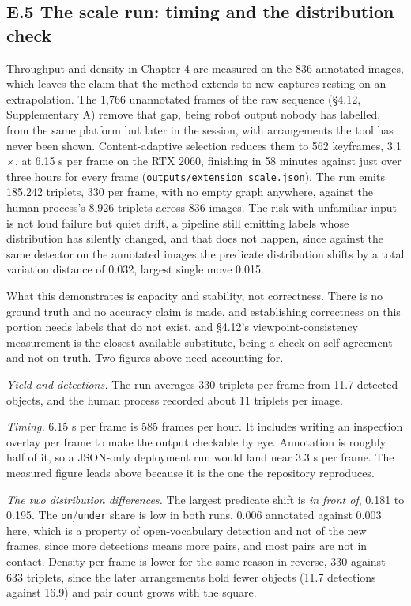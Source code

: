 \subsection{E.5 The scale run: timing and the distribution check}

Throughput and density in Chapter 4 are measured on the 836 annotated images, which leaves the claim that the method extends to new captures resting on an extrapolation. The 1,766 unannotated frames of the raw sequence (\S{}4.12, Supplementary A) remove that gap, being robot output nobody has labelled, from the same platform but later in the session, with arrangements the tool has never been shown. Content-adaptive selection reduces them to 562 keyframes, 3.1$\times$, at 6.15 s per frame on the RTX 2060, finishing in 58 minutes against just over three hours for every frame (\texttt{outputs/extension\_\allowbreak{}scale.json}). The run emits 185,242 triplets, 330 per frame, with no empty graph anywhere, against the human process's 8,926 triplets across 836 images. The risk with unfamiliar input is not loud failure but quiet drift, a pipeline still emitting labels whose distribution has silently changed, and that does not happen, since against the same detector on the annotated images the predicate distribution shifts by a total variation distance of 0.032, largest single move 0.015.

What this demonstrates is capacity and stability, not correctness. There is no ground truth and no accuracy claim is made, and establishing correctness on this portion needs labels that do not exist, and \S{}4.12's viewpoint-consistency measurement is the closest available substitute, being a check on self-agreement and not on truth. Two figures above need accounting for.

\textit{Yield and detections.} The run averages 330 triplets per frame from 11.7 detected objects, and the human process recorded about 11 triplets per image.

\textit{Timing.} 6.15 s per frame is 585 frames per hour. It includes writing an inspection overlay per frame to make the output checkable by eye. Annotation is roughly half of it, so a JSON-only deployment run would land near 3.3 s per frame. The measured figure leads above because it is the one the repository reproduces.

\textit{The two distribution differences.} The largest predicate shift is \textit{in front of}, 0.181 to 0.195. The \texttt{on}/\texttt{under} share is low in both runs, 0.006 annotated against 0.003 here, which is a property of open-vocabulary detection and not of the new frames, since more detections means more pairs, and most pairs are not in contact. Density per frame is lower for the same reason in reverse, 330 against 633 triplets, since the later arrangements hold fewer objects (11.7 detections against 16.9) and pair count grows with the square.

